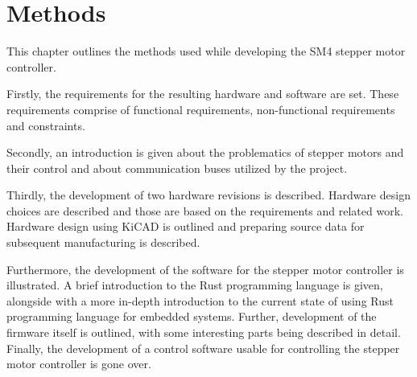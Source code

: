 \chapter{Methods}
\label{ch:methods}
This chapter outlines the methods used while developing the SM4 stepper motor controller.

Firstly, the requirements for the resulting hardware and software are set.
These requirements comprise of functional requirements, non-functional requirements and constraints.

Secondly, an introduction is given about the problematics of stepper motors and their control and about communication buses utilized by the project.

Thirdly, the development of two hardware revisions is described.
Hardware design choices are described and those are based on the requirements and related work.
Hardware design using KiCAD is outlined and preparing source data for subsequent manufacturing is described.

Furthermore, the development of the software for the stepper motor controller is illustrated.
A brief introduction to the Rust programming language is given, alongside with a more in-depth introduction to the current state of using Rust programming language for embedded systems.
Further, development of the firmware itself is outlined, with some interesting parts being described in detail.
Finally, the development of a control software usable for controlling the stepper motor controller is gone over.
